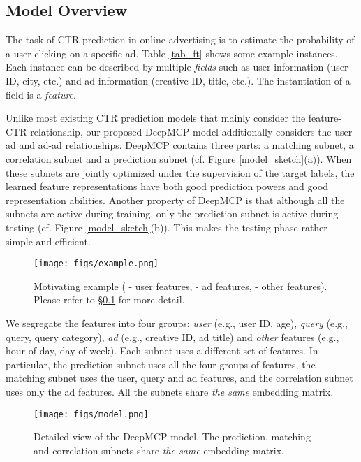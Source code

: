 \documentclass{article}
\begin{document}
\subsection{Model Overview} \label{sec_overview}
The task of CTR prediction in online advertising is to estimate the probability of a user clicking on a specific ad.
Table \ref{tab_ft} shows some example instances. Each instance can be described by multiple \emph{fields} such as user information (user ID, city, etc.) and ad information (creative ID, title, etc.). The instantiation of a field is a \emph{feature}.

Unlike most existing CTR prediction models that mainly consider the feature-CTR relationship, our proposed DeepMCP model additionally considers the user-ad and ad-ad relationships.
DeepMCP contains three parts: a matching subnet, a correlation subnet and a prediction subnet (cf. Figure \ref{model_sketch}(a)).
When these subnets are jointly optimized under the supervision of the target labels, the learned feature representations have both good prediction powers and good representation abilities.
Another property of DeepMCP is that although all the subnets are active during training, only the prediction subnet is active during testing (cf. Figure \ref{model_sketch}(b)). This makes the testing phase rather simple and efficient.

\begin{figure}[!t]
\centering
\texttt{[image: figs/example.png]}
\vskip -4pt
\caption{Motivating example ( - user features,  - ad features,  - other features). Please refer to \S\ref{sec_overview} for more detail.}
\vskip -6pt
\label{example}
\end{figure}

We segregate the features into four groups: \emph{user} (e.g., user ID, age), \emph{query} (e.g., query, query category), \emph{ad} (e.g., creative ID, ad title) and \emph{other} features (e.g., hour of day, day of week). Each subnet uses a different set of features. In particular, the prediction subnet uses all the four groups of features, the matching subnet uses the user, query and ad features, and the correlation subnet uses only the ad features.
All the subnets share \emph{the same} embedding matrix.

\begin{figure*}[!t]
\centering
\texttt{[image: figs/model.png]}
\vskip -4pt
\caption{Detailed view of the DeepMCP model. The prediction, matching and correlation subnets share \emph{the same} embedding matrix.}
\vskip -6pt
\label{model_detail}
\end{figure*}
\end{document}
